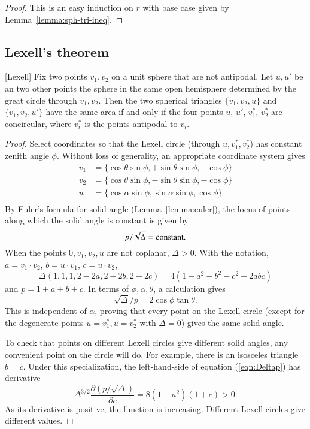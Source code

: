 \begin{proof} This is an easy induction on $r$ with base
case given by Lemma~\ref{lemma:sph-tri-ineq}.
\end{proof}

\subsection{Lexell's theorem}

\begin{lemma}[Lexell]
Fix two points $v_1,v_2$ on a unit sphere  that
are not antipodal.
Let $u,u'$ be an two other points the sphere in the same open hemisphere determined by the great circle through $v_1,v_2$.  Then the two spherical triangles $\{v_1,v_2,u\}$ and $\{v_1,v_2,u'\}$ have the same area if and only if
the four points $u$, $u'$, $v^*_1$, $v^*_2$ are concircular, where $v^*_i$ is the points antipodal to $v_i$.
\end{lemma}

\begin{proof}  Select coordinates so that the Lexell circle (through $u,v^*_1,v^*_2$) has constant zenith angle $\phi$.  Without loss of generality,  an appropriate coordinate system gives 
$$
\begin{array}{lll}
v_1 &= \{\cos\theta\sin\phi,+\sin\theta\sin\phi,-\cos\phi\}\\
v_2 &= \{\cos\theta\sin\phi,-\sin\theta\sin\phi,-\cos\phi\}\\
u &= \{\cos\alpha\sin\phi,\sin\alpha\sin\phi,\cos\phi\}\\
\end{array}
$$
By Euler's formula for solid angle (Lemma~\ref{lemma:euler}), the locus of points along which the solid angle is constant is given by
\begin{equation}\label{eqn:Deltap}
p/\sqrt{\Delta} = \hbox{constant}.
\end{equation}
When the points $0,v_1,v_2,u$ are not coplanar, $\Delta>0$.
With the notation, $a = v_1\cdot v_2$, $b = u\cdot v_1$, $c= u\cdot v_2$,  
$$
\Delta(1,1,1,2-2a,2-2b,2-2c) = 4 (1-a^2-b^2-c^2+2 a b c)
$$ 
and
$p = 1+a+b+c$.    In terms of $\phi,\alpha,\theta$, a calculation gives
$$
\sqrt{\Delta}/p = 2\cos\phi \tan\theta.
$$
This is independent of $\alpha$, proving that every point on the Lexell circle (except for the degenerate points $u= v^*_1,u=v^*_2$ with $\Delta=0$) gives the same solid angle.

To check that points on different Lexell circles give different solid angles,  any convenient point on the circle will do.  For example, there is an isosceles triangle $b=c$.  Under this specialization, the left-hand-side of equation (\ref{eqn:Deltap}) has derivative
$$
\Delta^{3/2} \frac{\partial (p/\sqrt{\Delta})}{\partial c} = 8 (1-a^2)(1+c) > 0.
$$
As its derivative is positive, the function is increasing.  Different Lexell circles give different values.
\end{proof}

